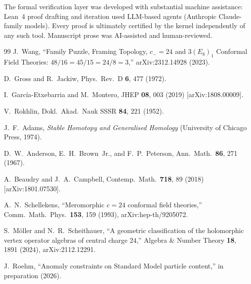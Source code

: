 \documentclass[aps,prl,twocolumn,superscriptaddress,nofootinbib]{revtex4-2}
\begin{document}
The formal verification layer was developed with substantial machine
assistance: Lean~4 proof drafting and iteration used LLM-based agents
(Anthropic Claude-family models). Every proof is ultimately certified
by the kernel independently of any such tool. Manuscript prose was
AI-assisted and human-reviewed.

\begin{thebibliography}{99}
J.~Wang, ``Family Puzzle, Framing Topology, $c_-=24$ and
$3(E_8)_1$ Conformal Field Theories: $48/16 = 45/15 = 24/8 = 3$,''
arXiv:2312.14928 (2023).

D.~Gross and R.~Jackiw,
Phys.\ Rev.\ D \textbf{6}, 477 (1972).

I.~Garc\'ia-Etxebarria and M.~Montero,
JHEP \textbf{08}, 003 (2019) [arXiv:1808.00009].

V.~Rokhlin, Dokl.\ Akad.\ Nauk SSSR \textbf{84}, 221 (1952).

J.~F.~Adams,
\emph{Stable Homotopy and Generalised Homology}
(University of Chicago Press, 1974).

D.~W.~Anderson, E.~H.~Brown~Jr., and F.~P.~Peterson,
Ann.\ Math.\ \textbf{86}, 271 (1967).

A.~Beaudry and J.~A.~Campbell,
Contemp.\ Math.\ \textbf{718}, 89 (2018)
[arXiv:1801.07530].

A.~N.~Schellekens,
``Meromorphic $c=24$ conformal field theories,''
Comm.\ Math.\ Phys.\ \textbf{153}, 159 (1993),
arXiv:hep-th/9205072.

S.~M\"oller and N.~R.~Scheithauer,
``A geometric classification of the holomorphic vertex operator
algebras of central charge $24$,''
Algebra \& Number Theory \textbf{18}, 1891 (2024),
arXiv:2112.12291.

J.~Roehm, ``Anomaly constraints on Standard Model particle content,''
in preparation (2026).

\end{thebibliography}
\end{document}
